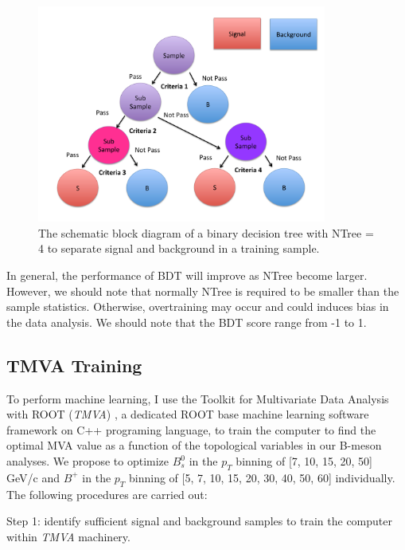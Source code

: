 \begin{figure}[h]
\begin{center}
\includegraphics[width= 0.85\textwidth]{Figures/Chapter5/DecisionTree.pdf}
\caption{The schematic block diagram of a binary decision tree with NTree = 4 to separate signal and background in a training sample.}
\label{DecisionTree}
\end{center}
\end{figure}

In general, the performance of BDT will improve as NTree become larger. However, we should note that normally NTree is required to be smaller than the sample statistics. Otherwise, overtraining may occur and could induces bias in the data analysis. We should note that the BDT score range from -1 to 1. 



\subsection{TMVA Training}


To perform machine learning, I use the Toolkit for Multivariate Data Analysis with ROOT (\textit{TMVA}) \cite{TMVA}, a dedicated ROOT base machine learning software framework on C++ programing language, to train the computer to find the optimal MVA value as a function of the topological variables in our B-meson analyses. We propose to optimize $B^0_s$ in the $p_T$ binning of [7, 10, 15, 20, 50] GeV/c and $B^+$ in the $p_T$ binning of [5, 7, 10, 15, 20, 30, 40, 50, 60] individually. The following procedures are carried out:

Step 1: identify sufficient signal and background samples to train the computer within \textit{TMVA} machinery. 

